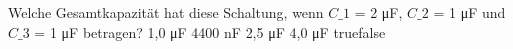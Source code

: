     {Welche Gesamtkapazität hat diese Schaltung, wenn $C\_1$ = 2 μF, $C\_2$ = 1 μF und $C\_3$ = 1 μF betragen? }
    {1,0 μF}
    {4400 nF}
    {2,5 μF}
    {4,0 μF}
    {true}{false}